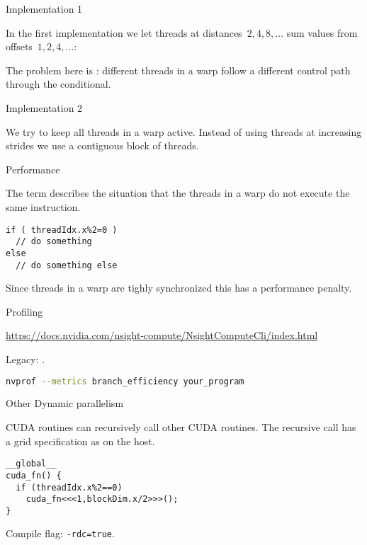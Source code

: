  {Implementation 1}

In the first implementation we let threads
at distances~$2,4,8,\ldots$ sum values
from offsets~$1,2,4,\ldots$:

The problem here is :
different threads in a warp follow a different control path
through the conditional.

 {Implementation 2}

We try to keep all threads in a warp active.
Instead of using threads at increasing strides
we use a contiguous block of threads.


 {Performance}

The term  describes the situation
that the threads in a warp do not execute the same instruction.
\begin{lstlisting}
if ( threadIdx.x%2=0 )
  // do something
else
  // do something else
\end{lstlisting}
Since threads in a warp are tighly synchronized
this has a performance penalty.

 {Profiling}

\url{https://docs.nvidia.com/nsight-compute/NsightComputeCli/index.html}

\begin{remark}
  Legacy: .
\begin{lstlisting}[language=bash]
nvprof --metrics branch_efficiency your_program
\end{lstlisting}
\end{remark}

 {Other}
 {Dynamic parallelism}

\ac{CUDA} routines can recursively call other
\ac{CUDA} routines.
The recursive call has a grid specification
as on the host.
\begin{lstlisting}
__global__
cuda_fn() {
  if (threadIdx.x%2==0)
    cuda_fn<<<1,blockDim.x/2>>>();
}
\end{lstlisting}

Compile flag: \lstinline[language=bash]{-rdc=true}.
